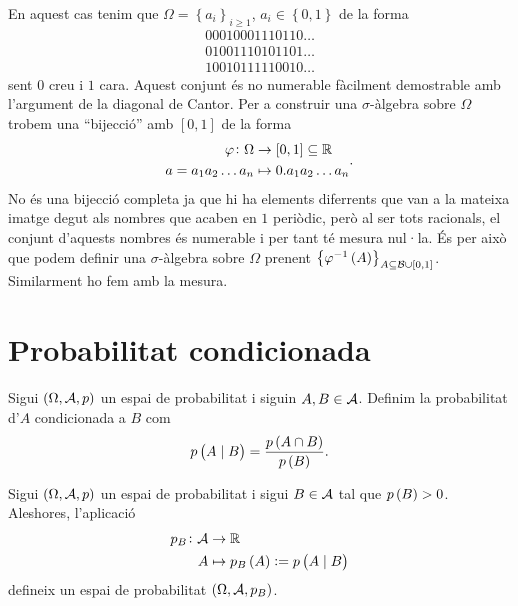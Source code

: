 \begin{example}
\begin{enumerate}
     En aquest cas tenim que $\Omega = \left\{a_i\right\}_{i\geq1}$, $a_i \in \left\{0,1\right\}$ de la forma
     \begin{gather*}
	00010001110110\dots \\
	01001110101101\dots \\
	10010111110010\dots 
     \end{gather*}
      sent $0$ creu i $1$ cara. Aquest conjunt és no numerable fàcilment demostrable amb l'argument de la diagonal de Cantor.
      Per a construir una $\sigma$-àlgebra sobre $\Omega$ trobem una ``bijecció'' amb $\left[0,1\right]$ de la forma
      \[
        \begin{aligned}
            \varphi\colon\Omega &\to [0,1]\subseteq\mathbb{R} \\
            a=a_1a_2\dots a_n &\mapsto 0.a_1a_2\dots a_n
        \end{aligned}.
      \]
      No és una bijecció completa ja que hi ha elements diferrents que van a la mateixa imatge degut als nombres que acaben en $1$ periòdic, però al ser tots racionals,
      el conjunt d'aquests nombres és numerable i per tant té mesura nul·la. És per això que podem definir una $\sigma$-àlgebra sobre $\Omega$ prenent 
      $\left\{\varphi^{-1}\left( A\right) \right\}_{A\subseteq \mathcal{B}\cup[0,1]}$. Similarment ho fem amb la mesura.
    \end{enumerate}
\end{example}


\section{Probabilitat condicionada}

\begin{defi}
    Sigui $\left( \Omega, \mathcal{A}, p\right)$ un espai de probabilitat i siguin $A, B \in \mathcal{A}$. Definim la probabilitat d'$A$ condicionada a $B$ com
    \[
        p\left( A\mid B\right) = \frac{p\left( A\cap B\right)}{p\left( B\right)}.
    \]
\end{defi}

\begin{obs}
    Sigui $\left( \Omega, \mathcal{A}, p\right)$ un espai de probabilitat i sigui $B \in \mathcal{A}$ tal que $p\left( B\right) > 0$. Aleshores, l'aplicació
    \begin{align*}
        p_B\colon \mathcal{A} &\to \mathbb{R} \\
        A &\mapsto p_B\left( A\right) := p\left( A\mid B\right)
    \end{align*}
    defineix un espai de probabilitat $\left( \Omega, \mathcal{A}, p_B\right)$.
\end{obs}

